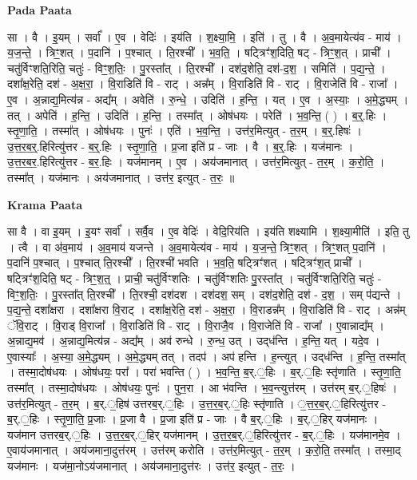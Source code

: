 \documentclass[17pt]{extarticle}
\begin{document}
\textbf{Pada Paata} \newline

सा । वै । इ॒यम् । सर्वा᳚ । ए॒व । वेदिः॑ । इय॑ति । श॒क्ष्या॒मि॒ । इति॑ । तु । वै । अ॒व॒मायेत्य॑व - माय॑ । य॒ज॒न्ते॒ । त्रिꣳ॒॒शत् । प॒दानि॑ । प॒श्चात् । ति॒रश्ची᳚ । भ॒व॒ति॒ । षट्त्रिꣳ॑श॒दिति॒ षट् - त्रिꣳ॒॒श॒त् । प्राची᳚ । चतु॑र्विꣳशति॒रिति॒ चतुः॑ - विꣳ॒॒श॒तिः॒ । पु॒रस्ता᳚त् । ति॒रश्ची᳚ । दश॑द॒शेति॒ दश॑-द॒श॒ । समिति॑ । प॒द्य॒न्ते॒ । दशा᳚क्ष॒रेति॒ दश॑ - अ॒क्ष॒रा॒ । वि॒राडिति॑ वि - राट् । अन्न᳚म् । वि॒राडिति॑ वि - राट् । वि॒राजेति॑ वि - राजा᳚ । ए॒व । अ॒न्नाद्य॒मित्य॑न्न - अद्य᳚म् । अवेति॑ । रु॒न्धे॒ । उदिति॑ । ह॒न्ति॒ । यत् । ए॒व । अ॒स्याः॒ । अ॒मे॒द्ध्यम् । तत् । अपेति॑ । ह॒न्ति॒ । उदिति॑ । ह॒न्ति॒ । तस्मा᳚त् । ओष॑धयः । परेति॑ । भ॒व॒न्ति॒ ( ) । ब॒र्॒.हिः । स्तृ॒णा॒ति॒ । तस्मा᳚त् । ओष॑धयः । पुनः॑ । एति॑ । भ॒व॒न्ति॒ । उत्त॑र॒मित्युत् - त॒र॒म् । ब॒र्॒.हिषः॑ । उ॒त्त॒र॒ब॒र्॒.हिरित्यु॑त्तर - ब॒र्॒.हिः । स्तृ॒णा॒ति॒ । प्र॒जा इति॑ प्र - जाः । वै । ब॒र्॒.हिः । यज॑मानः । उ॒त्त॒र॒ब॒र॒.हिरित्यु॑त्तर - ब॒र॒.हिः । यज॑मानम् । ए॒व । अय॑जमानात् । उत्त॑र॒मित्युत् - त॒र॒म् । क॒रो॒ति॒ । तस्मा᳚त् । यज॑मानः । अय॑जमानात् । उत्त॑र॒ इत्युत् - त॒रः॒ ॥  \newline


\textbf{Krama Paata} \newline

सा वै । वा इ॒यम् । इ॒यꣳ सर्वा᳚ । सर्वै॒व । ए॒व वेदिः॑ । वेदि॒रिय॑ति । इय॑ति शक्ष्यामि । श॒क्ष्या॒मीति॑ । इति॒ तु । त्वै । वा अ॑व॒माय॑ । अ॒व॒माय॑ यजन्ते । अ॒व॒मायेत्य॑व - माय॑ । य॒ज॒न्ते॒ त्रिꣳ॒॒शत् । त्रिꣳ॒॒शत् प॒दानि॑ । प॒दानि॑ प॒श्चात् । प॒श्चात् ति॒रश्ची᳚ । ति॒रश्ची॑ भवति । भ॒व॒ति॒ षट्त्रिꣳ॑शत् । षट्त्रिꣳ॑श॒त् प्राची᳚ । षट्त्रिꣳ॑श॒दिति॒ षट् - त्रिꣳ॒॒श॒त्॒ । प्राची॒ चतु॑र्विꣳशतिः । चतु॑र्विꣳशतिः पु॒रस्ता᳚त् । चतु॑र्विꣳशति॒रिति॒ चतुः॑ - विꣳ॒॒श॒तिः॒ । पु॒रस्ता᳚त् ति॒रश्ची᳚ । ति॒रश्ची॒ दश॑दश । दश॑दश॒ सम् । दश॑द॒शेति॒ दश॑ - द॒श॒ । सम् प॑द्यन्ते । प॒द्य॒न्ते॒ दशा᳚क्षरा । दशा᳚क्षरा वि॒राट् । दशा᳚क्ष॒रेति॒ दश॑ - अ॒क्ष॒रा॒ । वि॒राडन्न᳚म् । वि॒राडिति॑ वि - राट् । अन्न॑म् ॅवि॒राट् । वि॒राड् वि॒राजा᳚ । वि॒राडिति॑ वि - राट् । वि॒राजै॒व । वि॒राजेति॑ वि - राजा᳚ । ए॒वान्नाद्य᳚म् । अ॒न्नाद्य॒मव॑ । अ॒न्नाद्य॒मित्य॑न्न - अद्य᳚म् । अव॑ रुन्धे । रु॒न्ध॒ उत् । उद्‍ध॑न्ति । ह॒न्ति॒ यत् । यदे॒व । ए॒वास्याः᳚ । अ॒स्या॒ अ॒मे॒द्ध्यम् । अ॒मे॒द्ध्यम् तत् । तदप॑ । अप॑ हन्ति । ह॒न्त्युत् । उद्‍ध॑न्ति । ह॒न्ति॒ तस्मा᳚त् । तस्मा॒दोष॑धयः । ओष॑धयः॒ परा᳚ । परा॑ भवन्ति ( ) । भ॒व॒न्ति॒ ब॒र्.॒हिः । ब॒र्.॒हिः स्तृ॑णाति । स्तृ॒णा॒ति॒ तस्मा᳚त् । तस्मा॒दोष॑धयः । ओष॑धयः॒ पुनः॑ । पुन॒रा । आ भ॑वन्ति । भ॒व॒न्त्युत्त॑रम् । उत्त॑रम् ब॒र्.॒हिषः॑ । उत्त॑र॒मित्युत् - त॒र॒म् । ब॒र्.॒हिष॑ उत्तरब॒र्.॒हिः । उ॒त्त॒र॒ब॒र्.॒हिः स्तृ॑णाति । ॒त्त॒र॒ब॒र्.॒हिरित्यु॑त्तर - ब॒र्.॒हिः । स्तृ॒णा॒ति॒ प्र॒जाः । प्र॒जा वै । प्र॒जा इति॑ प्र - जाः । वै ब॒र्.॒हिः । ब॒र्.॒हिर् यज॑मानः । यज॑मान उत्तरब॒र्.॒हिः । उ॒त्त॒र॒ब॒र्.॒हिर् यज॑मानम् । उ॒त्त॒र॒ब॒र्.॒हिरित्यु॑त्तर - ब॒र्.॒हिः । यज॑मानमे॒व । ए॒वाय॑जमानात् । अय॑जमाना॒दुत्त॑रम् । उत्त॑रम् करोति । उत्त॑र॒मित्युत् - त॒र॒म् । क॒रो॒ति॒ तस्मा᳚त् । तस्मा॒द् यज॑मानः । यज॑मा॒नोऽय॑जमानात् । अय॑जमाना॒दुत्त॑रः । उत्त॑र॒ इत्युत् - त॒रः॒ । \newline
\end{document}
